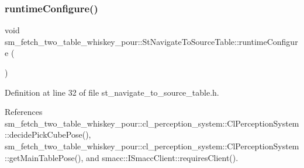 \subsubsection{\texorpdfstring{runtime\+Configure()}{runtimeConfigure()}}
{\footnotesize\ttfamily void sm\+\_\+fetch\+\_\+two\+\_\+table\+\_\+whiskey\+\_\+pour\+::\+St\+Navigate\+To\+Source\+Table\+::runtime\+Configure (\begin{DoxyParamCaption}{ }\end{DoxyParamCaption})\hspace{0.3cm}{\ttfamily [inline]}}



Definition at line 32 of file st\+\_\+navigate\+\_\+to\+\_\+source\+\_\+table.\+h.



References sm\+\_\+fetch\+\_\+two\+\_\+table\+\_\+whiskey\+\_\+pour\+::cl\+\_\+perception\+\_\+system\+::\+Cl\+Perception\+System\+::decide\+Pick\+Cube\+Pose(), sm\+\_\+fetch\+\_\+two\+\_\+table\+\_\+whiskey\+\_\+pour\+::cl\+\_\+perception\+\_\+system\+::\+Cl\+Perception\+System\+::get\+Main\+Table\+Pose(), and smacc\+::\+I\+Smacc\+Client\+::requires\+Client().


